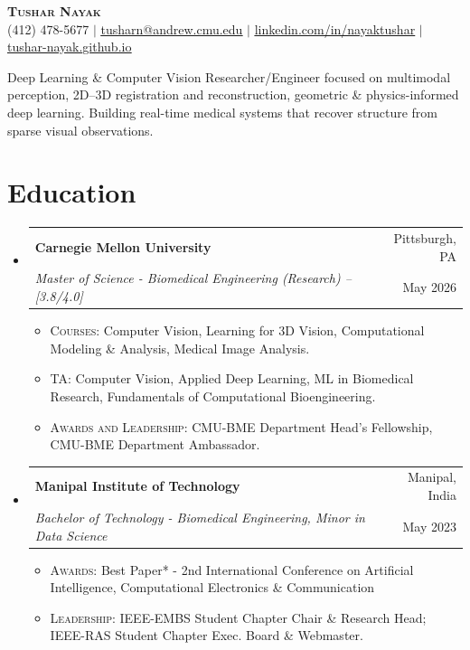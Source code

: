 \documentclass[letterpaper,10pt]{article}
\makeatletter
\newcommand{\resumeItem}[1]{\item\small{#1}}
\newcommand{\resumeSubheading}[4]{
  \vspace{-1pt}\item
    \begin{tabular*}{0.97\textwidth}[t]{l@{\extracolsep{\fill}}r}
      \textbf{#1} & #2 \\
      \textit{#3} & #4 \\
    \end{tabular*}\vspace{-3pt}
}
\newcommand{\resumeSubHeadingListStart}{\begin{itemize}[leftmargin=0.15in, label={}, itemsep=1pt, parsep=0pt]}
\newcommand{\resumeSubHeadingListEnd}{\end{itemize}}
\newcommand{\resumeItemListStartEdu}{\begin{itemize}[leftmargin=0.35in, itemsep=1pt, parsep=0pt]} %
\newcommand{\resumeItemListEnd}{\end{itemize}\vspace{-2pt}}
\makeatother
\begin{document}
\pagestyle{empty}

\begin{center}
    \textsc{\textbf{\LARGE Tushar Nayak}} \\ \vspace{5pt}
    \small (412) 478-5677 $|$ \href{mailto:tusharn@andrew.cmu.edu}{\underline{tusharn@andrew.cmu.edu}} $|$ 
    \href{https://linkedin.com/in/nayaktushar}{\underline{linkedin.com/in/nayaktushar}} $|$
    \href{https://tushar-nayak.github.io/}{\underline{tushar-nayak.github.io}}  
\end{center}

\vspace{-2pt}
\noindent\small
Deep Learning \& Computer Vision Researcher/Engineer focused on multimodal perception, 2D--3D registration and reconstruction, geometric \& physics-informed deep learning. Building real-time medical systems that recover structure from sparse visual observations.

\vspace{-2pt}

\section{Education}
  \resumeSubHeadingListStart
    \resumeSubheading
      {Carnegie Mellon University}{Pittsburgh, PA}
      {Master of Science - Biomedical Engineering (Research) -- [3.8/4.0] }{May 2026}
      \vspace{-0.5pt}
      \resumeItemListStartEdu %
        \resumeItem{\textsc{Courses:} Computer Vision, Learning for 3D Vision, Computational Modeling \& Analysis, Medical Image Analysis.}
        \resumeItem{\textsc{TA:} Computer Vision, Applied Deep Learning, ML in Biomedical Research, Fundamentals of Computational Bioengineering.}
        \resumeItem{\textsc{Awards and Leadership:} CMU-BME Department Head's Fellowship, CMU-BME Department Ambassador.}
      \resumeItemListEnd
      
    \resumeSubheading
      {Manipal Institute of Technology}{Manipal, India}
      {Bachelor of Technology - Biomedical Engineering, Minor in Data Science}{May 2023}
      \vspace{-0.5pt}
      \resumeItemListStartEdu %
        \resumeItem{\textsc{Awards:} Best Paper* - 2nd International Conference on Artificial Intelligence, Computational Electronics \& Communication}
        \resumeItem{\textsc{Leadership:} IEEE-EMBS Student Chapter Chair \& Research Head; IEEE-RAS Student Chapter Exec. Board \& Webmaster.}
      \resumeItemListEnd
  \resumeSubHeadingListEnd
\end{document}
